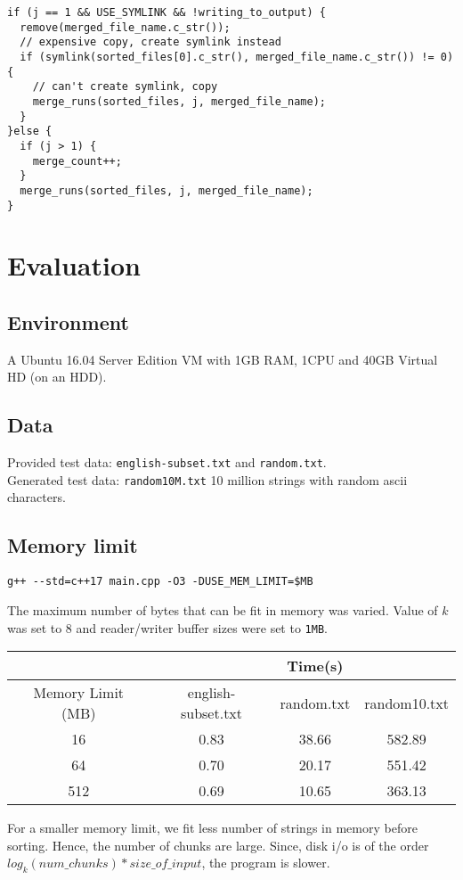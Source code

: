 \documentclass{article}
\begin{document}
\begin{itemize}
\begin{enumerate}[label=\star]
\begin{enumerate}
                            \begin{lstlisting}[style = cpp]
if (j == 1 && USE_SYMLINK && !writing_to_output) {
  remove(merged_file_name.c_str());
  // expensive copy, create symlink instead
  if (symlink(sorted_files[0].c_str(), merged_file_name.c_str()) != 0) {
    // can't create symlink, copy
    merge_runs(sorted_files, j, merged_file_name);
  }
}else {
  if (j > 1) {
    merge_count++;
  }
  merge_runs(sorted_files, j, merged_file_name);
}
                            \end{lstlisting}
                        \end{enumerate}
                \end{enumerate}
                                 
        \end{itemize}
\section{Evaluation}
\subsection{Environment}
A Ubuntu 16.04 Server Edition VM with 1GB RAM, 1CPU and 40GB Virtual HD (on an HDD).
\subsection{Data}
Provided test data: \verb|english-subset.txt| and \verb|random.txt|.\\
Generated test data: \verb|random10M.txt| 10 million strings with random ascii characters.
\subsection{Memory limit}
\begin{lstlisting}[style = cpp]
g++ --std=c++17 main.cpp -O3 -DUSE_MEM_LIMIT=$MB
\end{lstlisting}
The maximum number of bytes that can be fit in memory was varied. Value of $k$ was set to $8$ and reader/writer buffer sizes were set to \verb|1MB|.
\begin{center}
\begin{tabular}{||c| c c c||} 
 \hline
&&Time(s)&\\
 \hline
 Memory Limit (MB) & english-subset.txt & random.txt & random10.txt \\ [0.5ex] 
 \hline\hline
 16 & 0.83 & 38.66 & 582.89 \\ 
 \hline
 64 & 0.70 & 20.17 & 551.42 \\
 \hline
 512 & 0.69 & 10.65 & 363.13\\ %
 \hline
\end{tabular}
\end{center}
For a smaller memory limit, we fit less number of strings in memory before sorting. Hence, the number of chunks are large. Since, disk i/o is of the order $log_k(num\_chunks)*size\_of\_input$, the program is slower.
\end{document}
